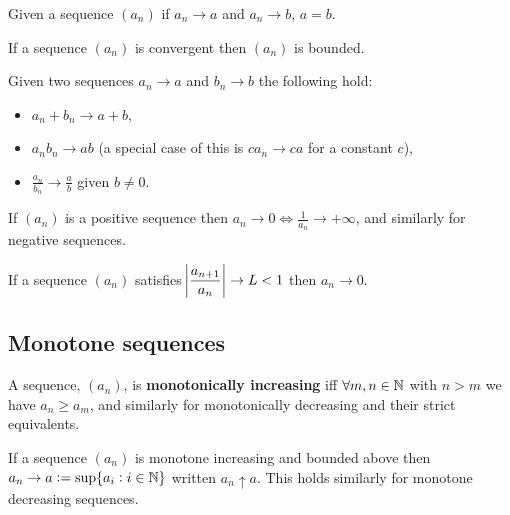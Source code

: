\documentclass[../Year1/Year1.tex]{subfiles}
\begin{document}
\begin{theorem}
    Given a sequence $(a_n)$ if $a_n\rightarrow a$ and $a_n\rightarrow b$, $a=b$.
\end{theorem}

\begin{theorem}
    If a sequence $(a_n)$ is convergent then $(a_n)$ is bounded.
\end{theorem}

\begin{theorem}
    Given two sequences $a_n\rightarrow a$ and $b_n\rightarrow b$ the following hold: \begin{itemize}
        \item $a_n + b_n \rightarrow a + b$,
        \item $a_nb_n \rightarrow ab$ (a special case of this is $ca_n\rightarrow ca$ for a constant $c$),
        \item $\displaystyle{\frac{a_n}{b_n} \rightarrow \frac{a}{b}}$ given $b\neq0$.
    \end{itemize}
\end{theorem}

\vspace{-15pt}

\begin{theorem}
    If $(a_n)$ is a positive sequence then $a_n\rightarrow0\iff\displaystyle{\frac{1}{a_n}\rightarrow+\infty}$, and similarly for negative sequences.
\end{theorem}

\begin{theorem}
    If a sequence $(a_n)$ satisfies $\displaystyle \abs{\frac{a_{n+1}}{a_n}}\rightarrow L <1$ then $a_n\rightarrow0$.
\end{theorem}

\subsection{Monotone sequences}

\begin{definition}
    A sequence, $(a_n)$, is \textbf{monotonically increasing} iff $\forall m,n\in\mathbb{N}$ with $n>m$ we have $a_n\geq a_m$, and similarly for monotonically decreasing and their strict equivalents.
\end{definition}

\begin{theorem}
    If a sequence $(a_n)$ is monotone increasing and bounded above then $a_n\rightarrow a := \sup\{a_i:i\in\mathbb{N}\}$ written $a_n\uparrow a$. This holds similarly for monotone decreasing sequences.
\end{theorem}
\end{document}

